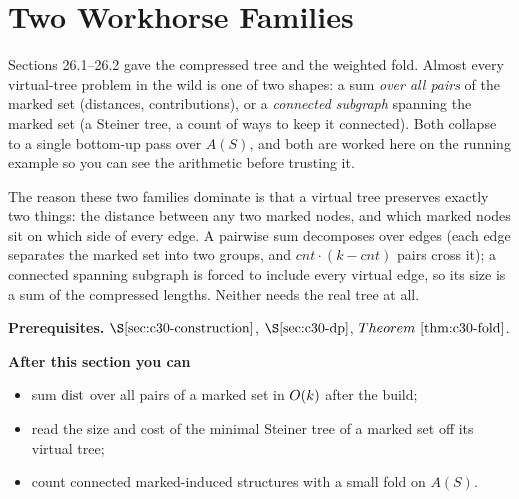 \section{Two Workhorse Families}\label{sec:c30-apps}

\begin{previouslybox}
Sections 26.1--26.2 gave the compressed tree and the weighted fold.  Almost every
virtual-tree problem in the wild is one of two shapes: a sum \emph{over all pairs}
of the marked set (distances, contributions), or a \emph{connected subgraph} spanning
the marked set (a Steiner tree, a count of ways to keep it connected).  Both collapse
to a single bottom-up pass over \(A(S)\), and both are worked here on the running
example so you can see the arithmetic before trusting it.
\end{previouslybox}

\begin{topicintro}
The reason these two families dominate is that a virtual tree preserves exactly two
things: the distance between any two marked nodes, and which marked nodes sit on which
side of every edge.  A pairwise sum decomposes over edges (each edge separates the
marked set into two groups, and \(\mathit{cnt}\cdot(k-\mathit{cnt})\) pairs cross it);
a connected spanning subgraph is forced to include every virtual edge, so its size is
a sum of the compressed lengths.  Neither needs the real tree at all.

\textbf{Prerequisites.} \(\secref{c30-construction}\), \(\secref{c30-dp}\),
\(\thmref{c30-fold}\).

\textbf{After this section you can}
\begin{itemize}[nosep]
  \item sum \(\operatorname{dist}\) over all pairs of a marked set in \(O(k)\) after the build; \hfill{}
  \item read the size and cost of the minimal Steiner tree of a marked set off its virtual tree; \hfill{}
  \item count connected marked-induced structures with a small fold on \(A(S)\). \hfill{}
\end{itemize}
\end{topicintro}

